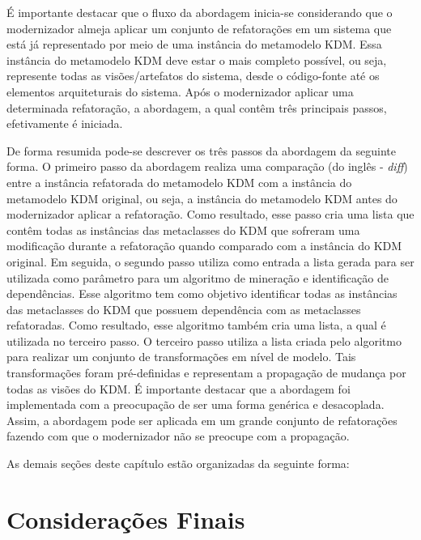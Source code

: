 É importante destacar que o fluxo da abordagem inicia-se considerando que o modernizador almeja aplicar um conjunto de refatorações em um sistema que está já representado por meio de uma instância do metamodelo KDM. Essa instância do metamodelo KDM deve estar o mais completo possível, ou seja, represente todas as visões/artefatos do sistema, desde o código-fonte até os elementos arquiteturais do sistema. Após o modernizador aplicar uma determinada refatoração, a abordagem, a qual contêm três principais passos, efetivamente é iniciada. 

De forma resumida pode-se descrever os três passos da abordagem da seguinte forma. O primeiro passo da abordagem realiza uma comparação (do inglês - \textit{diff}) entre a instância refatorada do metamodelo KDM com a instância do metamodelo KDM original, ou seja, a instância do metamodelo KDM antes do modernizador aplicar a refatoração. Como resultado, esse passo cria uma lista que contêm todas as instâncias das metaclasses do KDM que sofreram uma modificação durante a refatoração quando comparado com a instância do KDM original. Em seguida, o segundo passo utiliza como entrada a lista gerada para ser utilizada como parâmetro para um algoritmo de mineração e identificação de dependências. Esse algoritmo tem como objetivo identificar todas as instâncias das metaclasses do KDM que possuem dependência com as metaclasses refatoradas. Como resultado, esse algoritmo também cria uma lista, a qual é utilizada no terceiro passo. O terceiro passo utiliza a lista criada pelo algoritmo para realizar um conjunto de transformações em nível de modelo. Tais transformações foram pré-definidas e representam a propagação de mudança por todas as visões do KDM. É importante destacar que a abordagem foi implementada com a preocupação de ser uma forma genérica e desacoplada. Assim, a abordagem pode ser aplicada em um grande conjunto de refatorações fazendo com que o modernizador não se preocupe com a propagação. 

As demais seções deste capítulo estão organizadas da seguinte forma:



\section{Considerações Finais}
